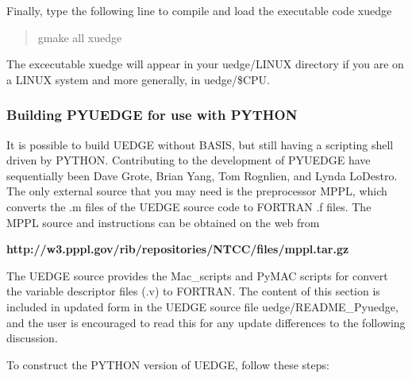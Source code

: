 \documentclass [12pt]{article}
\begin{document}
\noindent
Finally, type the following line to compile and load the executable 
code {\sf xuedge}
\begin{verse} \sf
    gmake all xuedge 
\end{verse}
The excecutable {\sf xuedge} will appear in your uedge/LINUX directory if you
are on a LINUX system and more generally, in uedge/\$CPU.

\subsubsection{Building {\sf PYUEDGE} for use with {\sf PYTHON}}
\label{pybuildsec}
It is possible to build {\sf UEDGE} without {\sf BASIS}, but still having a 
scripting shell driven by {\sf PYTHON}.   Contributing to the development of
{\sf PYUEDGE} have sequentially been Dave Grote, Brian Yang, Tom Rognlien, 
and Lynda LoDestro. The only external source that you may need is the
preprocessor {\sf MPPL}, which converts the .m files of the {\sf UEDGE}
source code to {\sf FORTRAN} .f files.  The MPPL source and instructions can 
be obtained on the web from

{\bf http://w3.pppl.gov/rib/repositories/NTCC/files/mppl.tar.gz }

The {\sf UEDGE} source provides the {\sf Mac\_scripts} and {\sf PyMAC} scripts for
convert the variable descriptor files (.v) to {\sf FORTRAN}.  The content of this section is
included in updated form in the {\sf UEDGE} source file uedge/README\_Pyuedge, and
the user is encouraged to read this for any update differences to the following discussion.

To construct the PYTHON version of UEDGE, follow these steps:
\end{document}
